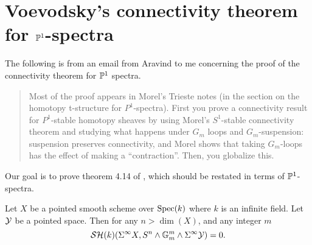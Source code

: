\documentclass{amsart}%
\begin{document}
\section{Voevodsky's connectivity theorem for $\mathbb{P}^1$-spectra}

The following is from an email from Aravind to me concerning the proof
of the connectivity theorem for $\mathbb{P}^1$ spectra.
\begin{quotation}
  Most of the proof appears in Morel's Trieste notes (in the section
  on the homotopy t-structure for $P^1$-spectra).  First you prove a
  connectivity result for $P^1$-stable homotopy sheaves by using
  Morel's $S^1$-stable connectivity theorem and studying what happens
  under $G_m$ loops and $G_m$-suspension: suspension preserves
  connectivity, and Morel shows that taking $G_m$-loops has the effect
  of making a ``contraction''.  Then, you globalize this.
\end{quotation}

Our goal is to prove theorem 4.14 of \cite{Voev98}, which should be
restated in terms of $\mathbb{P}^1$-spectra. 

\begin{theorem}
  Let $X$ be a pointed smooth scheme over $\operatorname{Spec}(k)$ where $k$ is an
  infinite field. Let $\mathcal{Y}$ be a pointed space. Then for any
  $n > \dim(X)$, and any integer $m$
  \begin{equation*}
    \mathcal{SH}(k)(\Sigma^{\infty}X, S^n\wedge \mathbb{G}_m^m \wedge \Sigma^{\infty} \mathcal{Y}) = 0.
  \end{equation*}

\end{theorem}
\end{document}
